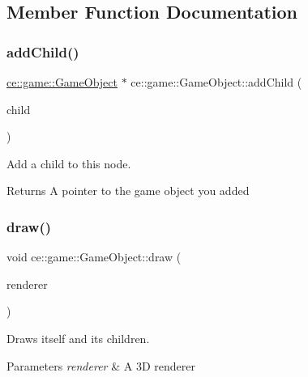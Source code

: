 \subsection{Member Function Documentation}
\mbox{\label{classce_1_1game_1_1_game_object_a3633057fc9ed4ae0a3c724f59f125c4f}} 
\subsubsection{\texorpdfstring{add\+Child()}{addChild()}}
{\footnotesize\ttfamily \hyperlink{classce_1_1game_1_1_game_object}{ce\+::game\+::\+Game\+Object} $\ast$ ce\+::game\+::\+Game\+Object\+::add\+Child (\begin{DoxyParamCaption}\item[{\hyperlink{classce_1_1game_1_1_game_object}{Game\+Object}}]{child }\end{DoxyParamCaption})}



Add a child to this node. 

\begin{DoxyReturn}{Returns}
A pointer to the game object you added 
\end{DoxyReturn}
\mbox{\label{classce_1_1game_1_1_game_object_ad5e81a50f4472e7557ec949eb3cc9413}} 
\subsubsection{\texorpdfstring{draw()}{draw()}}
{\footnotesize\ttfamily void ce\+::game\+::\+Game\+Object\+::draw (\begin{DoxyParamCaption}\item[{\hyperlink{classce_1_1graphics_1_1_renderer3_d}{ce\+::graphics\+::\+Renderer3D} $\ast$}]{renderer }\end{DoxyParamCaption})}



Draws itself and its children. 


\begin{DoxyParams}{Parameters}
{\em renderer} & A 3D renderer \\
\hline
\end{DoxyParams}
\mbox{\label{classce_1_1game_1_1_game_object_ac2597ef42f7b375013b744c6a7d65499}} 
